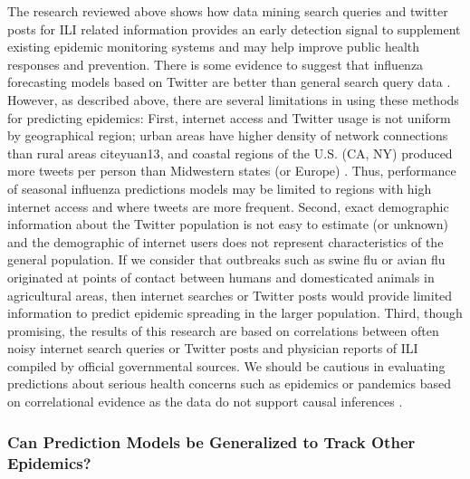 \documentclass[sigconf]{acmart}
\begin{document}
The research reviewed above shows how data mining search queries and twitter posts for 
ILI related information provides an early detection signal to supplement existing epidemic 
monitoring systems and may help improve public health responses and prevention. There is 
some evidence to suggest that influenza forecasting models based on Twitter are better than 
general search query data \cite{paul14}. However,  as described above, there are several 
limitations in using these methods for predicting epidemics: First, internet access and 
Twitter usage is not uniform by geographical region; urban areas have higher density of 
network connections than rural areas cite{yuan13}, and coastal regions of the U.S. (CA, NY) 
produced more tweets per person than Midwestern states (or Europe) \cite{achrekar12}. Thus, 
performance of seasonal influenza predictions models may be limited to regions with high 
internet access and where tweets are more frequent. Second, exact demographic information 
about the Twitter population is not easy to estimate (or unknown) and the demographic of 
internet users does not represent characteristics of the general population. If we consider 
that outbreaks such as swine flu or avian flu originated at points of contact between humans 
and domesticated animals in agricultural areas, then internet searches or Twitter posts would
provide limited information to predict epidemic spreading in the larger population. Third,
though promising, the results of this research are based on correlations between often noisy
internet search queries or Twitter posts and physician reports of ILI compiled by official 
governmental sources. We should be cautious in evaluating predictions about serious health 
concerns such as epidemics or pandemics based on correlational evidence as the data do not support causal inferences \cite{butler13, lazer14}. 

 
\subsubsection{Can Prediction Models be Generalized to Track Other Epidemics?}
\end{document}
